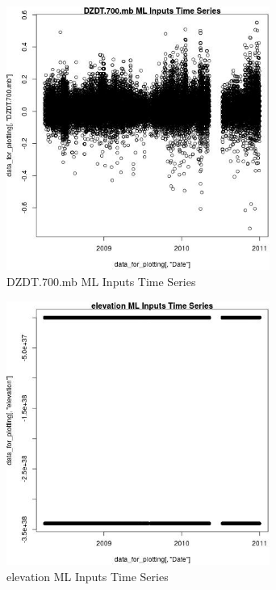 \begin{figure} 
\centering  
\includegraphics[width=0.77\textwidth]{Code_Outputs/ML_input_report_ML_input_PM25_Step5_part_d_de_duplicated_aves_ML_input_DZDT700mbvDate.jpg} 
\caption{\label{fig:ML_input_report_ML_input_PM25_Step5_part_d_de_duplicated_aves_ML_inputDZDT700mbvDate}DZDT.700.mb ML Inputs Time Series} 
\end{figure} 
 

\begin{figure} 
\centering  
\includegraphics[width=0.77\textwidth]{Code_Outputs/ML_input_report_ML_input_PM25_Step5_part_d_de_duplicated_aves_ML_input_elevationvDate.jpg} 
\caption{\label{fig:ML_input_report_ML_input_PM25_Step5_part_d_de_duplicated_aves_ML_inputelevationvDate}elevation ML Inputs Time Series} 
\end{figure} 
 

